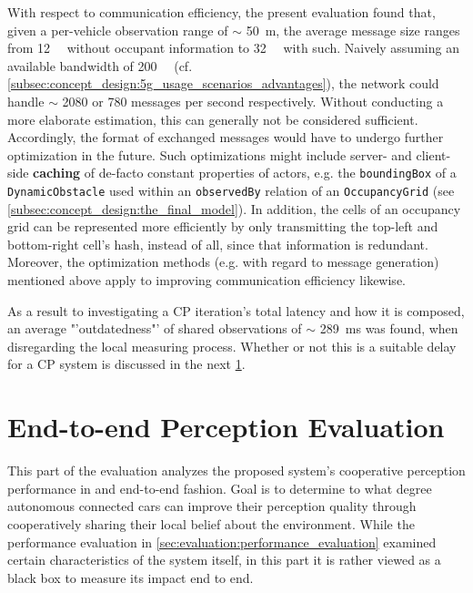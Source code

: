 With respect to communication efficiency, the present evaluation found that, given a per-vehicle observation range of $\sim$ \SI{50}{\meter}, the average message size ranges from \SI{12}{\kilo\byte} without occupant information to \SI{32}{\kilo\byte} with such. Naively assuming an available bandwidth of \SI{200}{\mega\bit} (cf. \cref{subsec:concept_design:5g_usage_scenarios_advantages}), the network could handle $\sim$ 2080 or 780 messages per second respectively. Without conducting a more elaborate estimation, this can generally not be considered sufficient. Accordingly, the format of exchanged messages would have to undergo further optimization in the future. Such optimizations might include server- and client-side \textbf{caching} of de-facto constant properties of actors, e.g. the \texttt{boundingBox} of a \texttt{DynamicObstacle} used within an \texttt{observedBy} relation of an \texttt{OccupancyGrid} (see \cref{subsec:concept_design:the_final_model}). In addition, the cells of an occupancy grid can be represented more efficiently by only transmitting the top-left and bottom-right cell's hash, instead of all, since that information is redundant. Moreover, the optimization methods (e.g. with regard to message generation) mentioned above apply to improving communication efficiency likewise.

As a result to investigating a CP iteration's total latency and how it is composed, an average "'outdatedness"' of shared observations of $\sim$ \SI{289}{\milli\second} was found, when disregarding the local measuring process. Whether or not this is a suitable delay for a CP system is discussed in the next \cref{sec:evaluation:perception_evaluation}.

\section{End-to-end Perception Evaluation}
\label{sec:evaluation:perception_evaluation}
This part of the evaluation analyzes the proposed system's cooperative perception performance in and end-to-end fashion. Goal is to determine to what degree autonomous connected cars can improve their perception quality through cooperatively sharing their local belief about the environment. While the performance evaluation in \cref{sec:evaluation:performance_evaluation} examined certain characteristics of the system itself, in this part it is rather viewed as a black box to measure its impact end to end. 
\par
\bigskip

